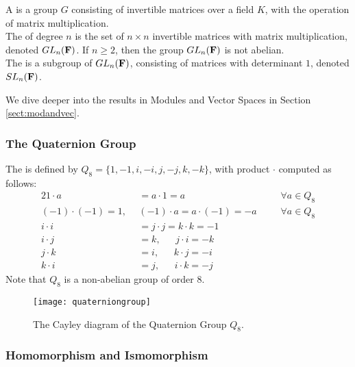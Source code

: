 \begin{definition}
A  is a group $G$ consisting of invertible matrices over a field $K$, with the operation of matrix multiplication.\\
The  of degree $n$ is the set of $n \times n$ invertible matrices with matrix multiplication, denoted $GL_n(\mathbf{F})$. If $n \geq 2$, then the group $GL_n(\mathbf{F})$ is not abelian.\\
The  is a subgroup of $GL_n(\mathbf{F})$, consisting of matrices with determinant $1$, denoted $SL_n(\mathbf{F})$.
\end{definition}

We dive deeper into the results in Modules and Vector Spaces in Section \ref{sect:modandvec}.

\subsubsection{The Quaternion Group}

\begin{definition}
The  is defined by $Q_8 = \{1, -1, i, -i, j, -j, k, -k\}$, with product $\cdot$ computed as follows:
\begin{alignat*}{2}
1 \cdot a &= a \cdot 1 = a &&\forall a \in Q_8 \nonumber \\
(-1) \cdot (-1) = 1,\ \ &(-1) \cdot a = a \cdot (-1) = -a \ \ \ \ &&\forall a \in Q_8 \nonumber \\
i \cdot i &= j \cdot j = k \cdot k= -1 \nonumber \\
i \cdot j &= k, \ \ \ \ \ \ \ j \cdot i = -k \nonumber \\
j \cdot k &= i, \ \ \ \ \ \ \ k \cdot j = -i \nonumber \\
k \cdot i &= j, \ \ \ \ \ \ \ i \cdot k = -j \nonumber
\end{alignat*}
Note that $Q_8$ is a non-abelian group of order 8.
\end{definition}

\begin{figure}[H]
\centering
\texttt{[image: quaterniongroup]}
\caption{The Cayley diagram of the Quaternion Group $Q_8$.}
\end{figure}

\subsubsection{Homomorphism and Ismomorphism}

